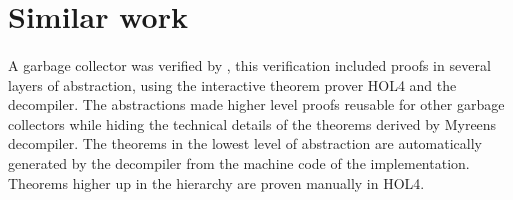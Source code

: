 \documentclass[fleqn]{kththesis}
\begin{document}
\begin{comment}
\section{Information flow analysis}
Information flow analysis is described on the language level by \parencite{sabelfeld_ifa}. It is a formalization of how information flows in a system. A variable is labeled either high (Secret) or low (Public) and the goal is to ensure that no information from a variable labeled high flows to a variable labeled low. \emph{Explicit flows} are when a variables information flows directly to another variable, for example an assignment. The label of the variable being assigned is then explicitly transferred to the new variable. \emph{Implicit flows} is when the information flow is indirect, for example if a high variable is in the condition of an if-statement and the body of the if-statement contains an assignment to a low variable.  The property of \emph{non-interference} can be informally defined (assuming determinism) either as "A change in a high input does not cause a change in low output" or "if all low inputs in two states are equal, the execution of those states are indistinguishable for an attacker". \\
One issue in cryptography is that encrypting usually takes (at least) two inputs that are labelled high and produces an output that should be labelled low. Without any other mechanics, that would be a breach of non-interference. Thus, \emph{selective declassification} is introduced, which is the ability to downgrade the security label of a variable from high to low. There is a general calculus called the spi calculus to check whether this is okay.
\end{comment}



\section{Similar work}
\paragraph{}
A garbage collector was verified by \textcite{myreen_garbage}, this verification included proofs in several layers of abstraction, using the interactive theorem prover HOL4 and the decompiler. The abstractions made higher level proofs reusable for other garbage collectors while hiding the technical details of the theorems derived by Myreens decompiler. The theorems in the lowest level of abstraction are automatically generated by the decompiler from the machine code of the implementation. Theorems higher up in the hierarchy are proven manually in HOL4. 
\end{document}
